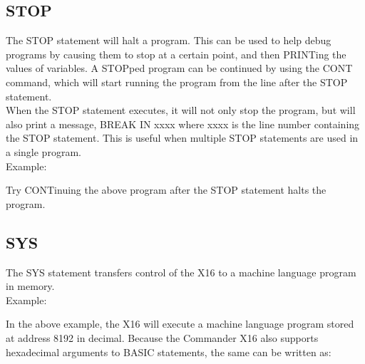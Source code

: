 \subsection{STOP}

The {\ttfamily STOP} statement will halt a program.  This can be used to help
debug programs by causing them to stop at a certain point, and then {\ttfamily
PRINT}ing the values of variables.  A {\ttfamily STOP}ped program can be
continued by using the {\ttfamily CONT} command, which will start running the
program from the line after the {\ttfamily STOP} statement.\\

When the {\ttfamily STOP} statement executes, it will not only stop the
program, but will also print a message, {\ttfamily BREAK IN xxxx} where
{\ttfamily xxxx} is the line number containing the {\ttfamily STOP} statement.
This is useful when multiple {\ttfamily STOP} statements are used in a single
program.\\

Example:\\


Try {\ttfamily CONT}inuing the above program after the {\ttfamily STOP}
statement halts the program.\\

\subsection{SYS}

The {\ttfamily SYS} statement transfers control of the X16 to a machine
language program in memory.\\

Example:\\


In the above example, the X16 will execute a machine language program stored at
address 8192 in decimal.  Because the Commander X16 also supports hexadecimal
arguments to BASIC statements, the same can be written as:\\


